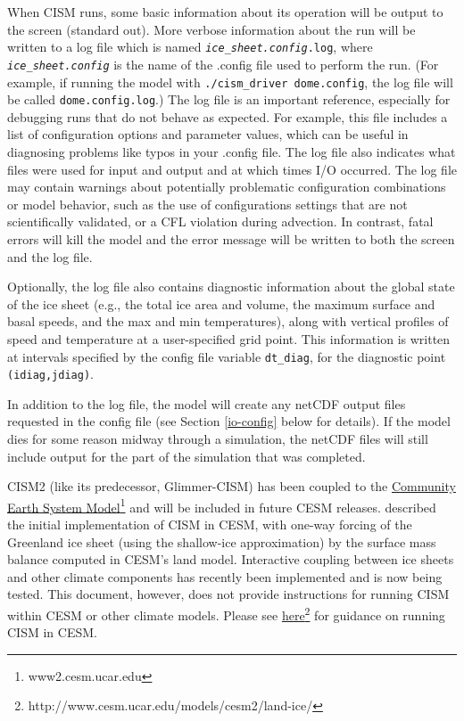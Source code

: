 When CISM runs, some basic information about its operation will be output to 
the screen (standard out).  More verbose information about the run will be written 
to a log file which is named \texttt{\textit{ice\_sheet.config}.log}, where 
\texttt{\textit{ice\_sheet.config}} is the name of the .config file used to perform
the run.  (For example, if running the model with \texttt{./cism\_driver dome.config},
the log file will be called  \texttt{dome.config.log}.)  The log file is an
important reference, especially for debugging runs that do not behave as expected.
For example, this file includes a list of configuration options and parameter
values, which can be useful in diagnosing problems like typos in your .config file.
The log file also indicates what files were used for input and output and at which
times I/O occurred.  The log file may contain warnings about potentially 
problematic configuration combinations or model behavior, such as the use of
configurations settings that are not scientifically validated, or a CFL violation
during advection.  In contrast, fatal errors will kill the model and the error
message will be written to both the screen and the log file.

Optionally, the log file also contains diagnostic information about the global
state of the ice sheet (e.g., the total ice area and volume, the maximum surface and basal
speeds, and the max and min temperatures), along with vertical profiles of speed
and temperature at a user-specified grid point.  This information is written at intervals
specified by the config file variable \texttt{dt\_diag}, for the diagnostic
point \texttt{(idiag,jdiag)}.

In addition to the log file, the model will create any netCDF output files requested
in the config file (see Section \ref{io-config} below for details).  
If the model dies for some reason midway through a simulation,
the netCDF files will still include output for the part of the simulation that 
was completed.

CISM2 (like its predecessor, Glimmer-CISM) has been coupled to the 
\href{https://www2.cesm.ucar.edu/}{Community Earth System Model}\footnote{www2.cesm.ucar.edu}
and will be included in future CESM releases. 
\citet{Lipscomb_2013} described the initial implementation of CISM in CESM, with one-way forcing
of the Greenland ice sheet (using the shallow-ice approximation) by the surface mass balance
computed in CESM's land model.  Interactive coupling between ice sheets and other climate components
has recently been implemented and is now being tested. This document, however, does not provide 
instructions for running CISM within CESM or other climate models. 
Please see \href{http://www.cesm.ucar.edu/models/cesm2/land-ice/}{here}\footnote{http://www.cesm.ucar.edu/models/cesm2/land-ice/}
for guidance on running CISM in CESM.


